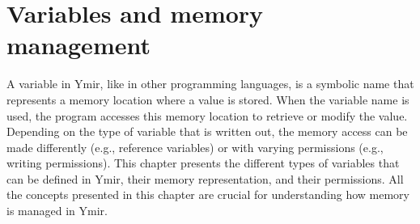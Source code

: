 \chapter{Variables and memory management}
\pagecolor{gray!10!white}
\label{chap:variables}

A variable in Ymir, like in other programming languages, is a symbolic name that
represents a memory location where a value is stored. When the variable name is
used, the program accesses this memory location to retrieve or modify the value.
Depending on the type of variable that is written out, the memory access can be
made differently (e.g., reference variables) or with varying permissions (e.g.,
writing permissions). This chapter presents the different types of variables
that can be defined in Ymir, their memory representation, and their permissions.
All the concepts presented in this chapter are crucial for understanding how
memory is managed in Ymir.

\minitoc%

